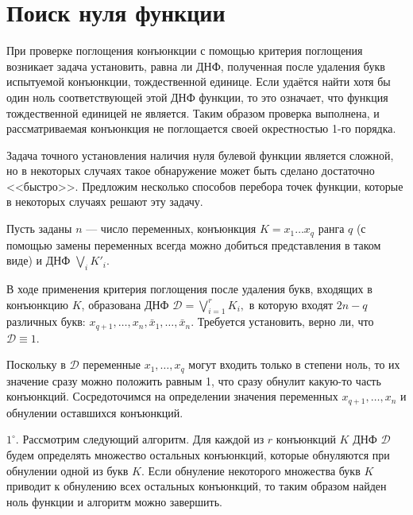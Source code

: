 \documentclass[12pt,a4paper,oneside,fleqn,leqno]{article}
\theoremstyle{definition}
\begin{document}
	\section{Поиск нуля функции}
		При проверке поглощения конъюнкции с помощью критерия поглощения возникает задача установить, равна ли ДНФ, полученная после удаления букв испытуемой конъюнкции, тождественной единице. Если удаётся найти хотя бы один ноль соответствующей этой ДНФ функции, то это означает, что функция тождественной единицей не является. Таким образом проверка выполнена, и рассматриваемая конъюнкция не поглощается своей окрестностью 1-го порядка.\par
		Задача точного установления наличия нуля булевой функции является сложной, но в некоторых случаях такое обнаружение может быть сделано достаточно <<быстро>>. Предложим несколько способов перебора точек функции, которые в некоторых случаях решают эту задачу.\par
		Пусть заданы $n$ --- число переменных, конъюнкция $K = x_1\ldots x_q$ ранга $q$ (с помощью замены переменных всегда можно добиться представления в таком виде) и ДНФ $\bigvee\limits_iK'_i.$\par
		В ходе применения критерия поглощения после удаления букв, входящих в конъюнкцию $K$, образована ДНФ $\mathcal{D} = \bigvee\limits_{i = 1}^rK_i,$ в которую входят $2n - q$ различных букв: $x_{q + 1},\ldots, x_n, \bar{x}_1,\ldots,\bar{x}_n$. Требуется установить, верно ли, что $\mathcal{D} \equiv 1.$\par
		Поскольку в $\mathcal{D}$ переменные $x_1,\ldots, x_q$ могут входить только в степени ноль, то их значение сразу можно положить равным 1, что сразу обнулит какую-то часть конъюнкций. Сосредоточимся на определении значения переменных $x_{q + 1},\ldots, x_n$ и обнулении оставшихся конъюнкций.\par
		$1^{\circ}.$ Рассмотрим следующий алгоритм. Для каждой из $r$ конъюнкций $K$ ДНФ $\mathcal{D}$ будем определять множество остальных конъюнкций, которые обнуляются при обнулении одной из букв $K.$ Если обнуление некоторого множества букв $K$ приводит к обнулению всех остальных конъюнкций, то таким образом найден ноль функции и алгоритм можно завершить.\par
\end{document}
